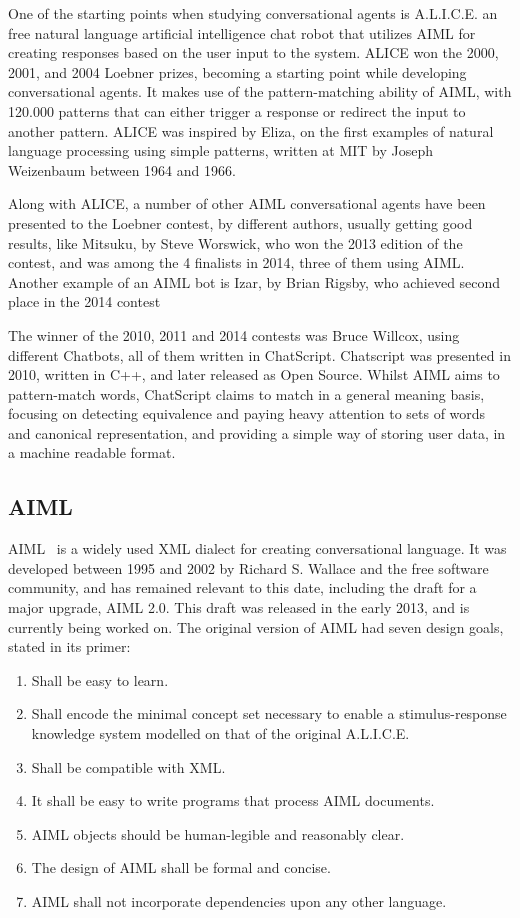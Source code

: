 One of the starting points when studying conversational agents is A.L.I.C.E. an free natural language artificial intelligence chat robot that utilizes \ac{AIML} for creating responses based on the user input to the system. ALICE won the 2000, 2001, and 2004 Loebner prizes, becoming a starting point while developing conversational agents. It makes use of the pattern-matching ability of \ac{AIML}, with 120.000 patterns that can either trigger a response or redirect the input to another pattern. ALICE was inspired by Eliza, on the first examples of natural language processing using simple patterns, written at MIT by Joseph Weizenbaum between 1964 and 1966.

Along with ALICE, a number of other \ac{AIML} conversational agents have been presented to the Loebner contest, by different authors, usually getting good results, like Mitsuku, by Steve Worswick, who won the 2013 edition of the contest, and was among the 4 finalists in 2014, three of them using \ac{AIML}. Another example of an \ac{AIML} bot is Izar, by Brian Rigsby, who achieved second place in the 2014 contest

The winner of the 2010, 2011 and 2014 contests was Bruce Willcox, using different Chatbots, all of them written in ChatScript. Chatscript was presented in 2010, written in C++, and later released as Open Source. Whilst \ac{AIML} aims to pattern-match words, ChatScript claims to match in a general meaning basis, focusing on detecting equivalence and paying heavy attention to sets of words and canonical representation, and providing a simple way of storing user data, in a machine readable format.

\subsection{\ac{AIML}}

\ac{AIML}~\cite{aimlprimer} is a widely used XML dialect for creating conversational language. It was developed between 1995 and 2002 by Richard S. Wallace and the free software community, and has remained relevant to this date, including the draft for a major upgrade, AIML 2.0. This draft was released in the early 2013, and is currently being worked on. The original version of AIML had seven design goals, stated in its primer:
\begin{enumerate}%
  \item Shall be easy to learn.
  \item Shall encode the minimal concept set necessary to enable a stimulus-response knowledge system modelled on that of the original A.L.I.C.E.
  \item Shall be compatible with XML.
  \item It shall be easy to write programs that process \ac{AIML} documents.
  \item \ac{AIML} objects should be human-legible and reasonably clear.
  \item The design of \ac{AIML} shall be formal and concise.
  \item \ac{AIML} shall not incorporate dependencies upon any other language.
\end{enumerate}

